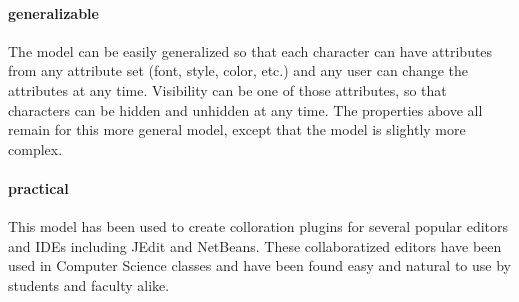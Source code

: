 \documentclass{amsart}
\begin{document}
\paragraph{\bf generalizable}
The model can be easily generalized so that each character can have attributes
from any attribute set (font, style, color, etc.) and any user can change the
attributes at any time. Visibility can be one of those attributes, so that 
characters can be hidden and unhidden at any time. The properties above 
all remain for this more general model, except that the model is slightly
more complex.

\paragraph{\bf practical} 
This model has been used to create colloration plugins for several
popular editors and IDEs including JEdit and NetBeans. These
collaboratized editors have been used in Computer Science classes
and have been found easy and natural to use by students and faculty
alike.
\end{document}
